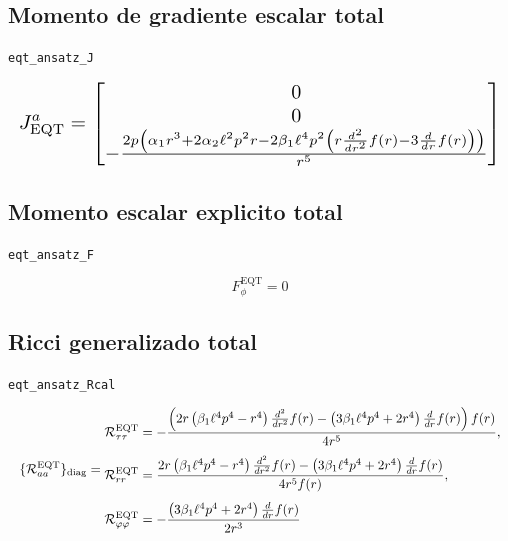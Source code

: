 \documentclass[11pt,a4paper]{article}
\begin{document}
\subsection{Momento de gradiente escalar total}

\noindent\texttt{eqt\_ansatz\_J}\par\nopagebreak[4]

\[
\resizebox{\textwidth}{!}{$\displaystyle J^a_{\mathrm{EQT}} = \left[\begin{matrix}0\\0\\- \frac{2 p \left(\alpha_{1} r^{3} + 2 \alpha_{2} \ell^{2} p^{2} r - 2 \beta_{1} \ell^{4} p^{2} \left(r \frac{d^{2}}{d r^{2}} f{\left(r \right)} - 3 \frac{d}{d r} f{\left(r \right)}\right)\right)}{r^{5}}\end{matrix}\right]$}
\]

\subsection{Momento escalar explicito total}

\noindent\texttt{eqt\_ansatz\_F}\par\nopagebreak[4]

\[
F^{\mathrm{EQT}}_\phi = 0
\]

\subsection{Ricci generalizado total}

\noindent\texttt{eqt\_ansatz\_Rcal}\par\nopagebreak[4]

\[
\resizebox{\textwidth}{!}{$\displaystyle \{\mathcal R^{\mathrm{EQT}}_{aa}\}_{\mathrm{diag}} = \begin{aligned}&\mathcal R^{\mathrm{EQT}}_{\tau\tau}=- \frac{\left(2 r \left(\beta_{1} \ell^{4} p^{4} - r^{4}\right) \frac{d^{2}}{d r^{2}} f{\left(r \right)} - \left(3 \beta_{1} \ell^{4} p^{4} + 2 r^{4}\right) \frac{d}{d r} f{\left(r \right)}\right) f{\left(r \right)}}{4 r^{5}},\\[4pt]&\mathcal R^{\mathrm{EQT}}_{rr}=\frac{2 r \left(\beta_{1} \ell^{4} p^{4} - r^{4}\right) \frac{d^{2}}{d r^{2}} f{\left(r \right)} - \left(3 \beta_{1} \ell^{4} p^{4} + 2 r^{4}\right) \frac{d}{d r} f{\left(r \right)}}{4 r^{5} f{\left(r \right)}},\\[4pt]&\mathcal R^{\mathrm{EQT}}_{\varphi\varphi}=- \frac{\left(3 \beta_{1} \ell^{4} p^{4} + 2 r^{4}\right) \frac{d}{d r} f{\left(r \right)}}{2 r^{3}}\end{aligned}$}
\]
\end{document}
